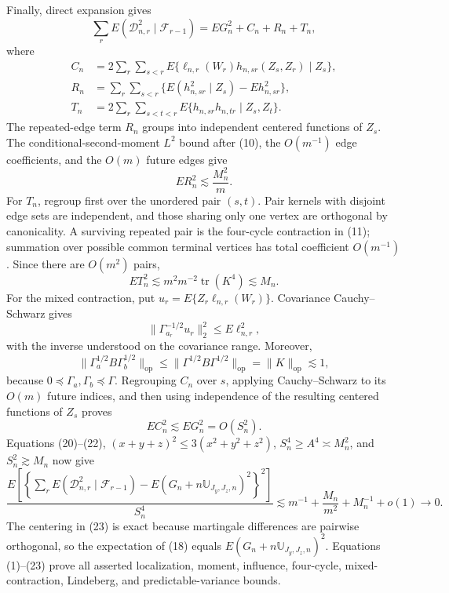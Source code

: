Finally, direct expansion gives
\[
\sum_rE(\mathcal D_{n,r}^2\mid\mathcal F_{r-1})
=EG_n^2+C_n+R_n+T_n, \tag{18}
\]
where
\[
\begin{split}
C_n&=2\sum_r\sum_{s<r}E\{\ell_{n,r}(W_r)h_{n,sr}(Z_s,Z_r)\mid Z_s\},\\
R_n&=\sum_r\sum_{s<r}\{E(h_{n,sr}^2\mid Z_s)-Eh_{n,sr}^2\},\\
T_n&=2\sum_r\sum_{s<t<r}E\{h_{n,sr}h_{n,tr}\mid Z_s,Z_t\}.
\end{split} \tag{19}
\]
The repeated-edge term \(R_n\) groups into independent centered functions of \(Z_s\). The conditional-second-moment \(L^2\) bound after (10), the \(O(m^{-1})\) edge coefficients, and the \(O(m)\) future edges give
\[
ER_n^2\lesssim\frac{M_n^2}{m}. \tag{20}
\]
For \(T_n\), regroup first over the unordered pair \((s,t)\). Pair kernels with disjoint edge sets are independent, and those sharing only one vertex are orthogonal by canonicality. A surviving repeated pair is the four-cycle contraction in (11); summation over possible common terminal vertices has total coefficient \(O(m^{-1})\). Since there are \(O(m^2)\) pairs,
\[
ET_n^2\lesssim m^2m^{-2}\operatorname{tr}(K^4)\lesssim M_n. \tag{21}
\]
For the mixed contraction, put \(u_r=E\{Z_r\ell_{n,r}(W_r)\}\). Covariance Cauchy--Schwarz gives
\[
\|\Gamma_{a_r}^{-1/2}u_r\|_2^2\le E\ell_{n,r}^2,
\]
with the inverse understood on the covariance range. Moreover,
\[
\|\Gamma_a^{1/2}B\Gamma_b^{1/2}\|_{\mathrm{op}}
\le\|\Gamma^{1/2}B\Gamma^{1/2}\|_{\mathrm{op}}
=\|K\|_{\mathrm{op}}\lesssim1,
\]
because \(0\preceq\Gamma_a,\Gamma_b\preceq\Gamma\). Regrouping \(C_n\) over \(s\), applying Cauchy--Schwarz to its \(O(m)\) future indices, and then using independence of the resulting centered functions of \(Z_s\) proves
\[
EC_n^2\lesssim EG_n^2=O(S_n^2). \tag{22}
\]
Equations (20)--(22), \((x+y+z)^2\le3(x^2+y^2+z^2)\), \(S_n^4\ge A^4\asymp M_n^2\), and \(S_n^2\gtrsim M_n\) now give
\[
\frac{E\left[\left\{\sum_rE(\mathcal D_{n,r}^2\mid\mathcal F_{r-1})
-E(G_n+n\mathbb U_{J_y,J_z,n})^2\right\}^2\right]}{S_n^4}
\lesssim m^{-1}+\frac{M_n}{m^2}+M_n^{-1}+o(1)\longrightarrow0. \tag{23}
\]
The centering in (23) is exact because martingale differences are pairwise orthogonal, so the expectation of (18) equals \(E(G_n+n\mathbb U_{J_y,J_z,n})^2\). Equations (1)--(23) prove all asserted localization, moment, influence, four-cycle, mixed-contraction, Lindeberg, and predictable-variance bounds.